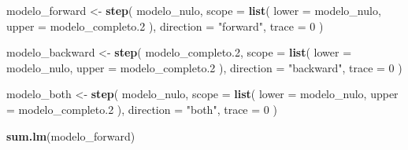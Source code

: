 \documentclass[
]{article}
\newenvironment{Shaded}{\begin{snugshade}}{\end{snugshade}}
\newcommand{\AttributeTok}[1]{\textcolor[rgb]{0.13,0.29,0.53}{#1}}
\newcommand{\DecValTok}[1]{\textcolor[rgb]{0.00,0.00,0.81}{#1}}
\newcommand{\FloatTok}[1]{\textcolor[rgb]{0.00,0.00,0.81}{#1}}
\newcommand{\FunctionTok}[1]{\textcolor[rgb]{0.13,0.29,0.53}{\textbf{#1}}}
\newcommand{\NormalTok}[1]{#1}
\newcommand{\OtherTok}[1]{\textcolor[rgb]{0.56,0.35,0.01}{#1}}
\newcommand{\StringTok}[1]{\textcolor[rgb]{0.31,0.60,0.02}{#1}}
\begin{document}
\begin{Shaded}
\begin{Highlighting}[]
\NormalTok{modelo\_forward }\OtherTok{\textless{}{-}} \FunctionTok{step}\NormalTok{(}
\NormalTok{  modelo\_nulo,}
  \AttributeTok{scope =} \FunctionTok{list}\NormalTok{(}
    \AttributeTok{lower =}\NormalTok{ modelo\_nulo,}
    \AttributeTok{upper =}\NormalTok{ modelo\_completo}\FloatTok{.2}
\NormalTok{  ),}
  \AttributeTok{direction =} \StringTok{"forward"}\NormalTok{,}
  \AttributeTok{trace =} \DecValTok{0}
\NormalTok{)}

\NormalTok{modelo\_backward }\OtherTok{\textless{}{-}} \FunctionTok{step}\NormalTok{(}
\NormalTok{  modelo\_completo}\FloatTok{.2}\NormalTok{,}
  \AttributeTok{scope =} \FunctionTok{list}\NormalTok{(}
    \AttributeTok{lower =}\NormalTok{ modelo\_nulo,}
    \AttributeTok{upper =}\NormalTok{ modelo\_completo}\FloatTok{.2}
\NormalTok{  ),}
  \AttributeTok{direction =} \StringTok{"backward"}\NormalTok{,}
  \AttributeTok{trace =} \DecValTok{0}
\NormalTok{)}

\NormalTok{modelo\_both }\OtherTok{\textless{}{-}} \FunctionTok{step}\NormalTok{(}
\NormalTok{  modelo\_nulo,}
  \AttributeTok{scope =} \FunctionTok{list}\NormalTok{(}
    \AttributeTok{lower =}\NormalTok{ modelo\_nulo,}
    \AttributeTok{upper =}\NormalTok{ modelo\_completo}\FloatTok{.2}
\NormalTok{  ),}
  \AttributeTok{direction =} \StringTok{"both"}\NormalTok{,}
  \AttributeTok{trace =} \DecValTok{0}
\NormalTok{)}
\end{Highlighting}
\end{Shaded}

\begin{Shaded}
\begin{Highlighting}[]
\FunctionTok{sum.lm}\NormalTok{(modelo\_forward)}
\end{Highlighting}
\end{Shaded}
\end{document}
